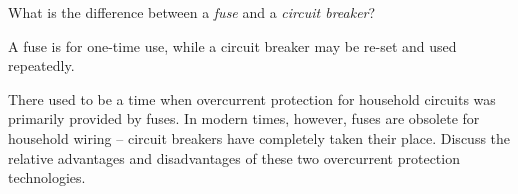 

What is the difference between a {\it fuse} and a {\it circuit breaker}?







A fuse is for one-time use, while a circuit breaker may be re-set and used repeatedly.







There used to be a time when overcurrent protection for household circuits was primarily provided by fuses.  In modern times, however, fuses are obsolete for household wiring -- circuit breakers have completely taken their place.  Discuss the relative advantages and disadvantages of these two overcurrent protection technologies.





